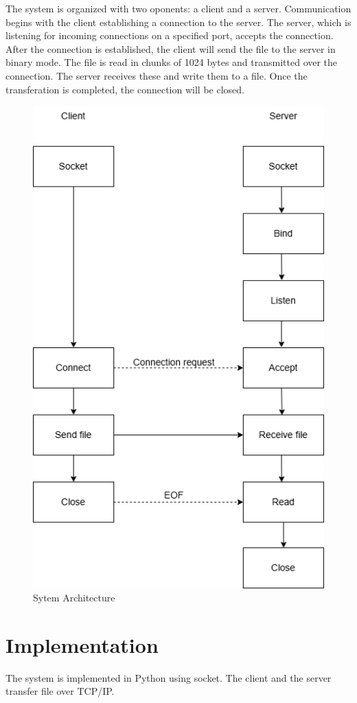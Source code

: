 \documentclass[12pt]{article}
\begin{document}
The system is organized with two oponents: a client and a server. Communication begins with the client establishing a connection to the server. The server, which is listening for incoming connections on a specified port, accepts the connection. After the connection is established, the client will send the file to the server in binary mode. The file is read in chunks of 1024 bytes and transmitted over the connection. The server receives these and write them to a file. Once the transferation is completed, the connection will be closed.

\begin{figure}[!ht]
\centering
\includegraphics[scale=0.5]{system_design.png}
\caption{Sytem Architecture}
\end{figure}


\section{Implementation}
The system is implemented in Python using socket. The client and the server transfer file over TCP/IP.
\end{document}
